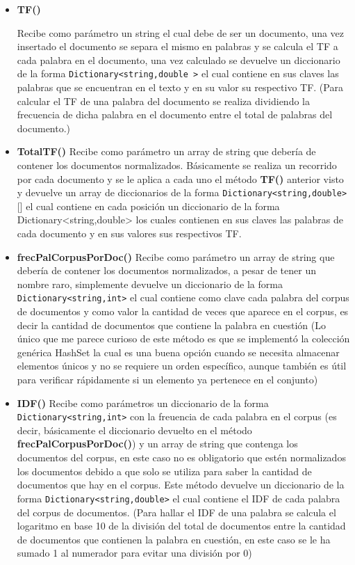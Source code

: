 \documentclass[a4paper,12pt]{article}
\begin{document}
\begin{itemize}
    \item \textbf{TF()}

Recibe como parámetro un string el cual debe de ser un documento, una vez insertado el documento se separa el mismo en palabras y se calcula el 
TF a cada palabra en el documento, una vez calculado se devuelve un diccionario de la forma \texttt{Dictionary\textless string,double \textgreater} el 
cual contiene en sus claves las palabras que se encuentran en el texto y en su valor su respectivo TF. (Para calcular el TF de una palabra del documento 
se realiza dividiendo la frecuencia de dicha palabra en el documento entre el total de palabras del documento.)

    \item \textbf{TotalTF()}
Recibe como parámetro un array de string que debería de contener los documentos normalizados. Básicamente se realiza un recorrido por cada documento 
y se le aplica a cada uno el método \textbf{TF()} anterior visto y devuelve un array de diccionarios de la forma \texttt{Dictionary\textless string,double\textgreater}[] el cual contiene en cada posición un diccionario de la forma Dictionary<string,double> los cuales contienen en sus claves las 
palabras de cada documento y en sus valores sus respectivos TF.

    \item \textbf{frecPalCorpusPorDoc()}
Recibe como parámetro un array de string que debería de contener los documentos normalizados, a pesar de tener un nombre raro, simplemente devuelve 
un diccionario de la forma \texttt{Dictionary\textless string,int\textgreater} el cual contiene como clave cada palabra del corpus de documentos y como valor la cantidad de veces que aparece en el corpus, es decir la cantidad de documentos que contiene la palabra en cuestión (Lo único que me parece curioso de este método es que se implementó la colección genérica HashSet la cual es una buena opción cuando se necesita almacenar elementos únicos y no se requiere un orden específico, aunque también es útil para verificar rápidamente si un elemento ya pertenece en el conjunto)

    \item \textbf{IDF()}
Recibe como parámetros un diccionario de la forma \texttt{Dictionary\textless string,int\textgreater} con la freuencia de cada palabra en el corpus (es decir, básicamente el diccionario devuelto en el método \textbf{frecPalCorpusPorDoc()}) y un array de string que contenga los documentos del corpus, en este caso no es obligatorio que estén normalizados los documentos debido a que solo se utiliza para saber la cantidad de documentos que hay en el corpus. Este método devuelve un diccionario de la forma \texttt{Dictionary\textless string,double\textgreater} el cual contiene el IDF de cada palabra del corpus de documentos. (Para hallar el IDF de una palabra se calcula el logaritmo en base 10 de la división del total de documentos entre la cantidad de documentos que contienen la palabra en cuestión, en este caso se le ha sumado 1 al numerador para evitar una división por 0)


\end{itemize}
\end{document}
